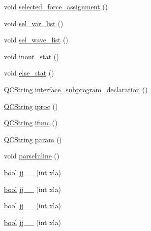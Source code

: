 \begin{DoxyCompactItemize}
\item 
void \hyperlink{classvhdl_1_1parser_1_1_vhdl_parser_a4b71f9ddc6f4295400c9987db639ecec}{selected\+\_\+force\+\_\+assignment} ()
\item 
void \hyperlink{classvhdl_1_1parser_1_1_vhdl_parser_adad3511652f319d3c884ac6474be4863}{sel\+\_\+var\+\_\+list} ()
\item 
void \hyperlink{classvhdl_1_1parser_1_1_vhdl_parser_adf97df6156a9b482a839135019ea0a0c}{sel\+\_\+wave\+\_\+list} ()
\item 
void \hyperlink{classvhdl_1_1parser_1_1_vhdl_parser_ad423ce460889719d7eb6552ab695c33a}{inout\+\_\+stat} ()
\item 
void \hyperlink{classvhdl_1_1parser_1_1_vhdl_parser_a1c5549cb6c77b011588f833f8082afbc}{else\+\_\+stat} ()
\item 
\hyperlink{class_q_c_string}{Q\+C\+String} \hyperlink{classvhdl_1_1parser_1_1_vhdl_parser_af67aabfcd0d0007ab39606a6a1505146}{interface\+\_\+subprogram\+\_\+declaration} ()
\item 
\hyperlink{class_q_c_string}{Q\+C\+String} \hyperlink{classvhdl_1_1parser_1_1_vhdl_parser_a2518aa48b517c835ed02ca2c40d084cf}{iproc} ()
\item 
\hyperlink{class_q_c_string}{Q\+C\+String} \hyperlink{classvhdl_1_1parser_1_1_vhdl_parser_a462061f985adebdf67a0cdf515e6b698}{ifunc} ()
\item 
\hyperlink{class_q_c_string}{Q\+C\+String} \hyperlink{classvhdl_1_1parser_1_1_vhdl_parser_af72367435320c2e50fc53081ca58fa5a}{param} ()
\item 
void \hyperlink{classvhdl_1_1parser_1_1_vhdl_parser_a3463fbacd6a380a44bb1ae4c6a0a1557}{parse\+Inline} ()
\item 
\hyperlink{qglobal_8h_a1062901a7428fdd9c7f180f5e01ea056}{bool} \hyperlink{classvhdl_1_1parser_1_1_vhdl_parser_ac8766cfd0152c09050f3706c8ef68496}{jj\+\_\+\_} (int xla)
\item 
\hyperlink{qglobal_8h_a1062901a7428fdd9c7f180f5e01ea056}{bool} \hyperlink{classvhdl_1_1parser_1_1_vhdl_parser_ae780cc4ee67917e53908f4f6517953be}{jj\+\_\+\_} (int xla)
\item 
\hyperlink{qglobal_8h_a1062901a7428fdd9c7f180f5e01ea056}{bool} \hyperlink{classvhdl_1_1parser_1_1_vhdl_parser_a96e44179eb6a19dbb02ea32efdb309d9}{jj\+\_\+\_} (int xla)
\item 
\hyperlink{qglobal_8h_a1062901a7428fdd9c7f180f5e01ea056}{bool} \hyperlink{classvhdl_1_1parser_1_1_vhdl_parser_a6d0ada7ff453104c7ae399d92630bc27}{jj\+\_\+\_} (int xla)

\end{DoxyCompactItemize}
